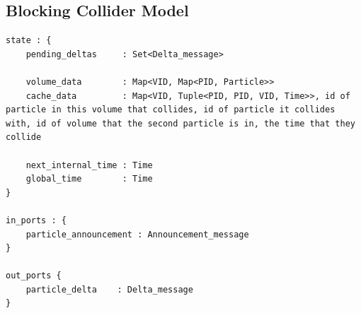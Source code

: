 \documentclass[conference]{IEEEtran}
\begin{document}
\subsection{Blocking Collider Model}
\begin{lstlisting}
state : {
	pending_deltas     : Set<Delta_message>
	
	volume_data        : Map<VID, Map<PID, Particle>>
	cache_data         : Map<VID, Tuple<PID, PID, VID, Time>>, id of particle in this volume that collides, id of particle it collides with, id of volume that the second particle is in, the time that they collide
	
	next_internal_time : Time
	global_time        : Time
}

in_ports : {
	particle_announcement : Announcement_message
}

out_ports {
	particle_delta    : Delta_message
}
\end{lstlisting}
\end{document}
